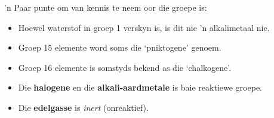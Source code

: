  'n Paar punte om van kennis te neem oor die groepe is:
        \label{m38757*id261581}\begin{itemize}[noitemsep]
            \label{m38757*uid135}\item Hoewel waterstof in groep 1 verskyn is, is dit nie 'n alkalimetaal nie.
\item Groep 15 elemente word soms die ‘pniktogene’ genoem.
\label{m38757*id6232}\item Groep 16 elemente is somstyds bekend as die ‘chalkogene’.
\label{m38757*uid142}\item Die \textbf{halogene} en die \textbf{alkali-aardmetale} is baie reaktiewe groepe.
\label{m38757*uid143}\item Die \textbf{edelgasse} is \textsl{inert} (onreaktief).   
\end{itemize}            



